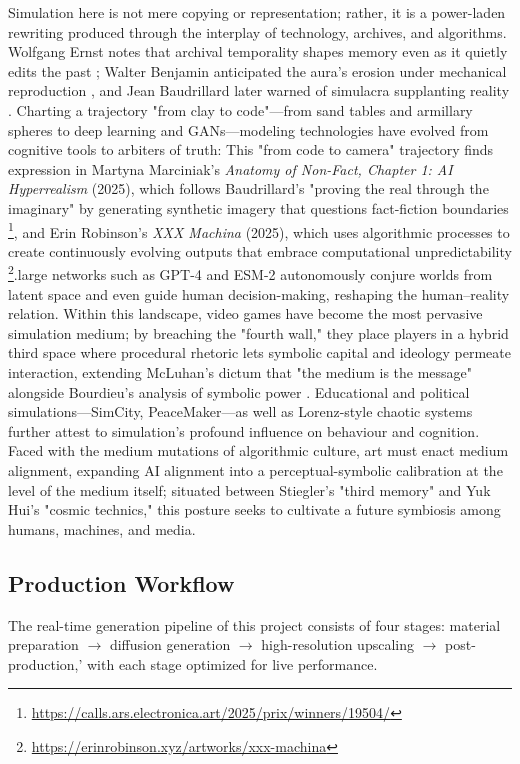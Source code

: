 \documentclass[sigconf,nonacm]{acmart}
\begin{document}
Simulation here is not mere copying or representation; rather, it is a power-laden rewriting produced through the interplay of technology, archives, and algorithms. Wolfgang Ernst notes that archival temporality shapes memory even as it quietly edits the past \citep{Ernst_Archive}; Walter Benjamin anticipated the aura's erosion under mechanical reproduction \citep{Benjamin_WorkOfArt}, and Jean Baudrillard later warned of simulacra supplanting reality \cite{Baudrillard_Simulacra}. Charting a trajectory "from clay to code"—from sand tables and armillary spheres to deep learning and GANs—modeling technologies have evolved from cognitive tools to arbiters of truth: This "from code to camera" trajectory finds expression in Martyna Marciniak's \textit{Anatomy of Non-Fact, Chapter 1: AI Hyperrealism} (2025), which follows Baudrillard's "proving the real through the imaginary" by generating synthetic imagery that questions fact-fiction boundaries \cite{Marciniak2025ArsElectronica}\footnote{\url{https://calls.ars.electronica.art/2025/prix/winners/19504/}}, and Erin Robinson's \textit{XXX Machina} (2025), which uses algorithmic processes to create continuously evolving outputs that embrace computational unpredictability \cite{Robinson2025XXX}\footnote{\url{https://erinrobinson.xyz/artworks/xxx-machina}}.large networks such as GPT-4 and ESM-2 autonomously conjure worlds from latent space and even guide human decision-making, reshaping the human–reality relation. Within this landscape, video games have become the most pervasive simulation medium; by breaching the "fourth wall," they place players in a hybrid third space where procedural rhetoric lets symbolic capital and ideology permeate interaction, extending McLuhan's dictum that "the medium is the message" \cite{McLuhan_UnderstandingMedia} alongside Bourdieu's analysis of symbolic power \cite{Bourdieu_SymbolicPower}. Educational and political simulations—SimCity, PeaceMaker—as well as Lorenz-style chaotic systems further attest to simulation's profound influence on behaviour and cognition. Faced with the medium mutations of algorithmic culture, art must enact medium alignment, expanding AI alignment into a perceptual-symbolic calibration at the level of the medium itself; situated between Stiegler's "third memory" \cite{Stiegler_TechnicsTime1} and Yuk Hui's "cosmic technics," \cite{Hui_Cosmotechnics} this posture seeks to cultivate a future symbiosis among humans, machines, and media.



\subsection{Production Workflow}
The real-time generation pipeline of this project consists of four stages: material preparation $\rightarrow$ diffusion generation $\rightarrow$ high-resolution upscaling $\rightarrow$ post-production,' with each stage optimized for live performance.
\end{document}
